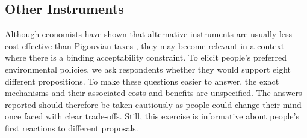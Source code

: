 \documentclass[english,5p,authoryear]{elsarticle}
\begin{document}
    \subsection{Other Instruments}


Although economists have shown that alternative instruments are usually less cost-effective than Pigouvian taxes \citep[e.g.][]{goulder_parry_2008}, they may become relevant in a context where there is a binding acceptability constraint. To elicit people's preferred environmental policies, we ask respondents whether they would support eight different propositions. To make these questions easier to answer, the exact mechanisms and their associated costs and benefits are unspecified. The answers reported should therefore be taken cautiously as people could change their mind once faced with clear trade-offs. Still, this exercise is informative about people's first reactions to different proposals.


\end{document}
